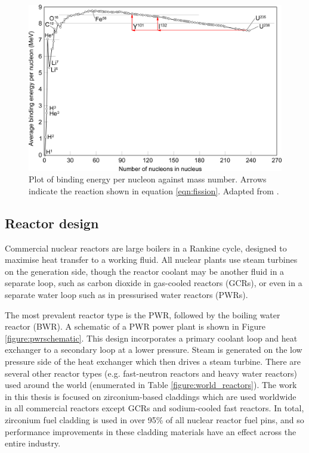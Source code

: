 \begin{figure}[ht]
\centering
\includegraphics[width=14cm]{images/Binding_energy_curve.png}
\caption[Plot of binding energy per nucleon against mass number. Arrows indicate the reaction shown in equation \ref{eqn:fission}.]{Plot of binding energy per nucleon against mass number. Arrows indicate the reaction shown in equation \ref{eqn:fission}. Adapted from \cite{Fastfission}.}
\label{figure:bindingenergy}
\end{figure}

\subsection{Reactor design} %

Commercial nuclear reactors are large boilers in a Rankine cycle, designed to maximise heat transfer to a working fluid. All nuclear plants use steam turbines on the generation side, though the reactor coolant may be another fluid in a separate loop, such as carbon dioxide in gas-cooled reactors (GCRs), or even in a separate water loop such as in pressurised water reactors (PWRs). 

The most prevalent reactor type is the PWR, followed by the boiling water reactor (BWR). A schematic of a PWR power plant is shown in Figure \ref{figure:pwrschematic}. This design incorporates a primary coolant loop and heat exchanger to a secondary loop at a lower pressure. Steam is generated on the low pressure side of the heat exchanger which then drives a steam turbine. There are several other reactor types (e.g. fast-neutron reactors and heavy water reactors) used around the world (enumerated in Table \ref{figure:world_reactors}). The work in this thesis is focused on zirconium-based claddings which are used worldwide in all commercial reactors except GCRs and sodium-cooled fast reactors. In total, zirconium fuel cladding is used in over 95\% of all nuclear reactor fuel pins, and so performance improvements in these cladding materials have an effect across the entire industry.

